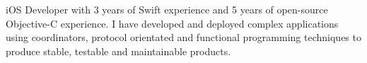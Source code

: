 %
iOS Developer with 3 years of Swift experience and 5 years of open-source
Objective-C experience.
I have developed and deployed complex applications using coordinators, protocol
orientated and functional programming techniques to produce stable, testable and
maintainable products.

\bigskip

